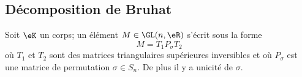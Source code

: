 \subsection{Décomposition de Bruhat}

\begin{theorem}    \label{ThoizlYJO}
    Soit \( \eK\) un corps; un élément \( M\in\GL(n,\eR)\) s'écrit sous la forme
    \begin{equation}
        M=T_1P_{\sigma}T_2
    \end{equation}
    où \( T_1\) et \( T_2\) sont des matrices triangulaires supérieures inversibles et où \( P_{\sigma}\) est une matrice de permutation \( \sigma\in S_n\). De plus il y a unicité de \( \sigma\).
\end{theorem}

